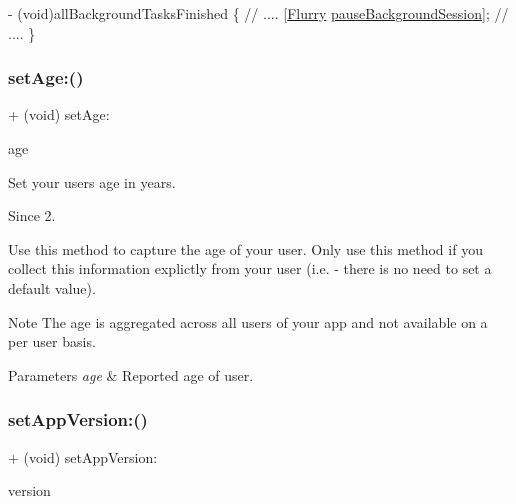 \begin{DoxyCode}
   - (void)allBackgroundTasksFinished
\{
\textcolor{comment}{// ....}
[\hyperlink{interfaceFlurry}{Flurry} \hyperlink{interfaceFlurry_a57e18dc7c992272e3dc89e7f3bc853f4}{pauseBackgroundSession}];
\textcolor{comment}{// ....}
\}
\end{DoxyCode}
 \mbox{\label{interfaceFlurry_a55692f576c987dc0ed73a2ba4aa31710}} 
\subsubsection{\texorpdfstring{set\+Age\+:()}{setAge:()}}
{\footnotesize\ttfamily + (void) set\+Age\+: \begin{DoxyParamCaption}\item[{(int)}]{age }\end{DoxyParamCaption}}



Set your user\textquotesingle{}s age in years. 

\begin{DoxySince}{Since}
2.
\end{DoxySince}
Use this method to capture the age of your user. Only use this method if you collect this information explictly from your user (i.\+e. -\/ there is no need to set a default value).

\begin{DoxyNote}{Note}
The age is aggregated across all users of your app and not available on a per user basis.
\end{DoxyNote}

\begin{DoxyParams}{Parameters}
{\em age} & Reported age of user. \\
\hline
\end{DoxyParams}
\mbox{\label{interfaceFlurry_a4ccd9b24965b9f514f525a9eb15d071d}} 
\subsubsection{\texorpdfstring{set\+App\+Version\+:()}{setAppVersion:()}}
{\footnotesize\ttfamily + (void) set\+App\+Version\+: \begin{DoxyParamCaption}\item[{(N\+S\+String $\ast$)}]{version }\end{DoxyParamCaption}}



